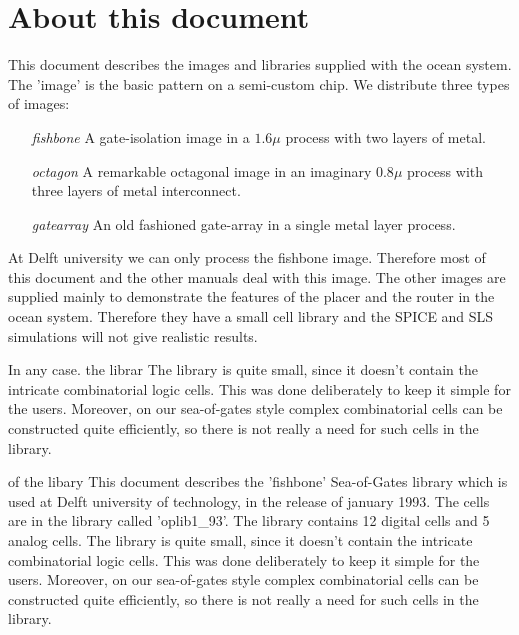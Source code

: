 
\section{About this document}


This document describes the images and libraries supplied with the {\sc ocean}
system. The 'image' is the basic pattern on a semi-custom chip. We distribute
three types of images:
\begin{itemize}
\item[{\em fishbone}]
A gate-isolation image in a $1.6 \mu$ process with two layers of metal. 
\item[{\em octagon}]
A remarkable octagonal image in an imaginary $0.8 \mu$ process with three layers
of metal interconnect. 
\item[{\em gatearray}]
An old fashioned gate-array in a single metal layer process.
\end{itemize}
At Delft university we can only process the fishbone image.  Therefore most of
this document and the other manuals deal with this image. The other images are
supplied mainly to demonstrate the features of the placer and the router in the
{\sc ocean} system.  Therefore they have a small cell library and the SPICE and
SLS simulations will not give realistic results. 

In any case. the librar The library is quite small, since it doesn't contain
the intricate combinatorial logic cells. This was done deliberately to keep
it simple for the users. Moreover, on our sea-of-gates style complex
combinatorial cells can be constructed quite efficiently, so there is not
really a need for such cells in the library.


of the libary
This document describes the 'fishbone' Sea-of-Gates library which is used at
Delft university of technology, in the release of january 1993. The cells
are in the library called 'oplib1\_93'. The library contains 12 digital cells
and 5 analog cells.  The library is quite small, since it doesn't contain
the intricate combinatorial logic cells. This was done deliberately to keep
it simple for the users. Moreover, on our sea-of-gates style complex
combinatorial cells can be constructed quite efficiently, so there is not
really a need for such cells in the library.

